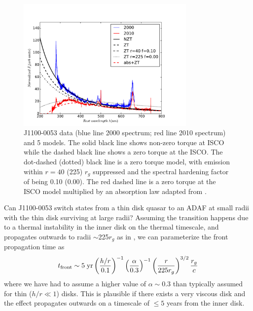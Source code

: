\documentclass[a4paper,fleqn,usenatbib]{mnras}
\begin{document}
\begin{figure}
  \centering
  \includegraphics[width=8.7cm, trim=0.2cm 0.2cm 1.4cm 0.6cm, clip]
  {mcd_gap_v3_4_b1.pdf}
  \vspace{-12pt}
  \caption[]{
    J1100-0053 data (blue line 2000 spectrum; red line 2010 spectrum) and
    5 models. The solid black line shows non-zero torque at ISCO
    \citep[following][]{Afshordi_Paczynski2003} while the
    dashed black line shows a zero torque at the ISCO. 
    The dot-dashed  (dotted) black line is a zero torque model, with emission
    within $r=40$ (225) $r_{g}$ suppressed and the spectral hardening factor of
  \citet{Zimmerman2005} being 0.10 (0.00). 
  The red dashed line is a zero
  torque at the ISCO model multiplied by an absorption law adapted from
  \citet{Guo2016}.
}
  \label{fig:disk_suppression}
\end{figure}
Can J1100-0053 switch states from a thin disk quasar to an ADAF at
small radii with the thin disk surviving at large radii?  Assuming the
transition happens due to a thermal instability in the inner disk on
the thermal timescale, and propagates outwards to radii
$\sim$225$r_{g}$ as in \citet{Nemmen2006}, we can parameterize the
front propagation time as
\begin{equation}
    t_{\rm front}  \sim  5 \; {\rm yr} \left(\frac{h/r}{0.1}\right)^{-1}
                                                           \left(\frac{\alpha}{0.3}\right)^{-1}  
                                                           \left(\frac{r}{225r_{g}}\right)^{3/2}  
                                                           \frac{r_{g}}{c}
\label{eqn:t_front}
\end{equation}
where we have had to assume a higher value of $\alpha \sim 0.3$
\citep{King2007} than typically assumed for thin ($h/r \ll 1$)
disks. This is plausible if there exists a very viscous disk and the
effect propagates outwards on a timescale of $\leq 5$ years from the
inner disk.
\end{document}
